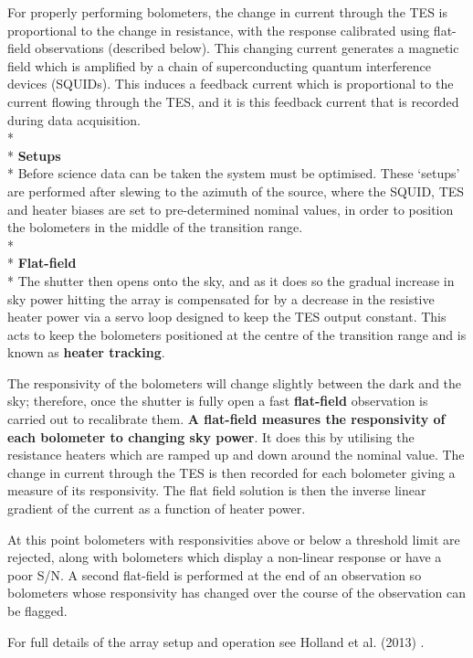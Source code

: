 \documentclass[twoside,11pt]{article}
\renewcommand{\_}{\texttt{\symbol{95}}}
\begin{document}
For properly performing bolometers, the change in current through the
TES is proportional to the change in resistance, with the response
calibrated using flat-field observations (described below). This
changing current generates a magnetic field which is amplified by a
chain of superconducting quantum interference devices (SQUIDs). This
induces a feedback current which is proportional to the current
flowing through the TES, and it is this feedback current that is
recorded during data acquisition.
\\*\\*
\textbf{Setups}\\*
Before science data can be taken the system must be optimised. These
`setups' are performed after slewing to the azimuth of the source,
where the SQUID, TES and heater biases are set to pre-determined
nominal values, in order to position the bolometers in the middle of
the transition range.
\\*\\*
\textbf{Flat-field}\\*
 The shutter then opens onto the sky, and
as it does so the gradual increase in sky power hitting the array is
compensated for by a decrease in the resistive heater power via a
servo loop designed to keep the TES output constant. This acts to keep
the bolometers positioned at the centre of the transition range and is
known as \textbf{heater tracking}.

The responsivity of the bolometers will change slightly between the
dark and the sky; therefore, once the shutter is fully open a fast
\textbf{flat-field} observation is carried out to recalibrate them.
\textbf{A flat-field measures the responsivity of each bolometer to
changing sky power}. It does this by utilising the resistance heaters
which are ramped up and down around the nominal value. The change in
current through the TES is then recorded for each bolometer giving a
measure of its responsivity. The flat field solution is then the
inverse linear gradient of the current as a function of heater power.

At this point bolometers with responsivities above or below a
threshold limit are rejected, along with bolometers which display a
non-linear response or have a poor S/N. A second flat-field is
performed at the end of an observation so bolometers whose
responsivity has changed over the course of the observation can be
flagged.

For full details of the array setup and operation see Holland et al.
(2013) \cite{s2main}.
\end{document}
